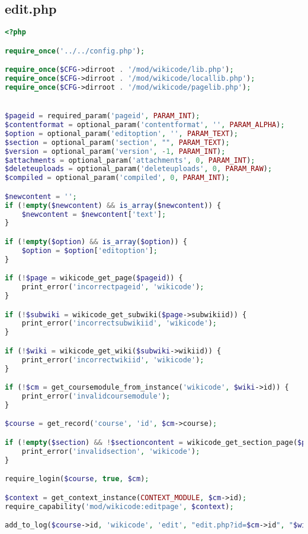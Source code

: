\subsection{edit.php}
\begin{lstlisting}[language=PHP]
<?php

require_once('../../config.php');

require_once($CFG->dirroot . '/mod/wikicode/lib.php');
require_once($CFG->dirroot . '/mod/wikicode/locallib.php');
require_once($CFG->dirroot . '/mod/wikicode/pagelib.php');


$pageid = required_param('pageid', PARAM_INT);
$contentformat = optional_param('contentformat', '', PARAM_ALPHA);
$option = optional_param('editoption', '', PARAM_TEXT);
$section = optional_param('section', "", PARAM_TEXT);
$version = optional_param('version', -1, PARAM_INT);
$attachments = optional_param('attachments', 0, PARAM_INT);
$deleteuploads = optional_param('deleteuploads', 0, PARAM_RAW);
$compiled = optional_param('compiled', 0, PARAM_INT);

$newcontent = '';
if (!empty($newcontent) && is_array($newcontent)) {
    $newcontent = $newcontent['text'];
} 

if (!empty($option) && is_array($option)) {
    $option = $option['editoption'];
}

if (!$page = wikicode_get_page($pageid)) {
    print_error('incorrectpageid', 'wikicode');
}

if (!$subwiki = wikicode_get_subwiki($page->subwikiid)) {
    print_error('incorrectsubwikiid', 'wikicode');
}

if (!$wiki = wikicode_get_wiki($subwiki->wikiid)) {
    print_error('incorrectwikiid', 'wikicode');
}

if (!$cm = get_coursemodule_from_instance('wikicode', $wiki->id)) {
    print_error('invalidcoursemodule');
}

$course = get_record('course', 'id', $cm->course);

if (!empty($section) && !$sectioncontent = wikicode_get_section_page($page, $section)) {
    print_error('invalidsection', 'wikicode');
}

require_login($course, true, $cm);

$context = get_context_instance(CONTEXT_MODULE, $cm->id);
require_capability('mod/wikicode:editpage', $context);

add_to_log($course->id, 'wikicode', 'edit', "edit.php?id=$cm->id", "$wiki->id");


\end{lstlisting}
